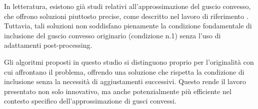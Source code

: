In letteratura, esistono già studi relativi all'approssimazione del guscio convesso, 
che offrono soluzioni piuttosto precise, come descritto nel lavoro di riferimento 
\cite{CHApproximation}. 
Tuttavia, tali soluzioni non soddisfano pienamente la condizione fondamentale 
di inclusione del guscio convesso originario (condizione n.1) senza l'uso di 
adattamenti post-processing.

Gli algoritmi proposti in questo studio si distinguono proprio per l'originalità 
con cui affrontano il problema, offrendo una soluzione che rispetta la condizione 
di inclusione senza la necessità di aggiustamenti successivi. 
Questo rende il lavoro presentato non solo innovativo, ma anche potenzialmente 
più efficiente nel contesto specifico dell'approssimazione di gusci convessi.